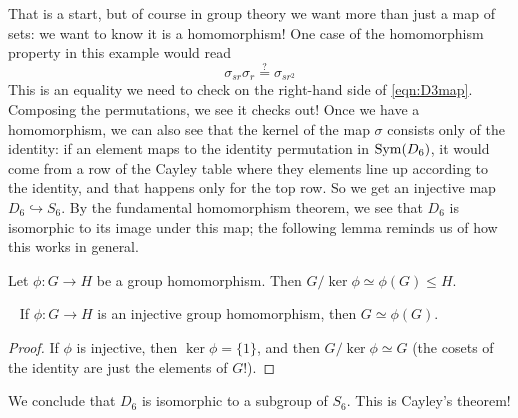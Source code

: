 That is a start, but of course in group theory we want more than just a map of sets: we want to know it is a homomorphism!  One case of the homomorphism property in this example would read
\begin{equation} 
\sigma_{sr}\sigma_{r} \overset{?}{=} \sigma_{sr^2} 
\end{equation}
This is an equality we need to check on the right-hand side of \eqref{eqn:D3map}.  Composing the permutations, we see it checks out!  Once we have a homomorphism, we can also see that the kernel of the map $\sigma$ consists only of the identity: if an element maps to the identity permutation in $\operatorname{Sym}(D_6)$, it would come from a row of the Cayley table where they elements line up according to the identity, and that happens only for the top row.  So we get an injective map $D_6 \hookrightarrow S_6$.  By the fundamental homomorphism theorem, we see that $D_6$ is isomorphic to its image under this map; the following lemma reminds us of how this works in general.

\begin{thm}
Let $\phi \colon G \to H$ be a group homomorphism.  Then $G/\ker \phi \simeq \phi(G) \leq H$.
\end{thm}

\begin{corollary}~\label{cor:injG}
If $\phi \colon G \to H$ is an injective group homomorphism, then $G \simeq \phi(G)$.
\end{corollary}

\begin{proof}
If $\phi$ is injective, then $\ker \phi =\{1\}$, and then $G/\ker \phi \simeq G$ (the cosets of the identity are just the elements of $G$!).
\end{proof}

We conclude that $D_6$ is isomorphic to a subgroup of $S_6$.  This is Cayley's theorem!  
